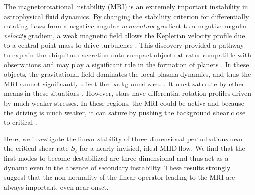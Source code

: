 \documentclass[aps,prl,reprint,superscriptaddress]{revtex4-1}
\begin{document}
The magnetorotational instability (MRI) is an extremely important instability in astrophysical fluid dynamics.
By changing the stabiliity criterion for differentially rotating flows from a negative angular \emph{momentum} gradient to a negative angular \emph{velocity} gradient, a weak magnetic field allows the Keplerian velocity profile due to a central point mass to drive turbulence \citep[e.g.][]{1998RvMP...70....1B}.
This discovery provided a pathway to explain the ubiquitous accretion onto compact objects at rates compatible with observations and may play a significant role in the formation of planets \citep[e.g.][]{2007Natur.448.1022J}.
In these objects, the gravitational field dominates the local plasma dynamics, and thus the MRI cannot significantly affect the background shear.
It must saturate by other means in these situations \citep{2018MNRAS.474.3451X}.
However, stars have differential rotation profiles driven by much weaker stresses.
In these regions, the MRI could be active and because the driving is much weaker, it can sature by pushing the background shear close to critical \citep{2017ApJ...841....1C,2017ApJ...841....2C}.

Here, we investigate the linear stability of three dimensional perturbations near the critical shear rate $S_c$ for a nearly invisicd, ideal MHD flow.
We find that the first modes to become destabilized are three-dimensional and thus act as a dynamo even in the absence of secondary instability.
These results strongly suggest that the non-normality of the linear operator leading to the MRI are always important, even near onset.
\end{document}
